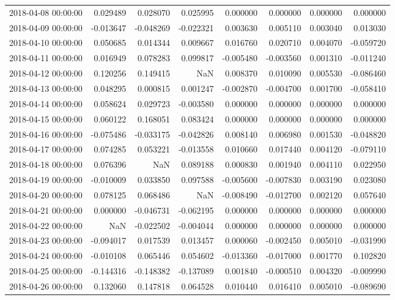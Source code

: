\begin{tabular}{lrrrrrrr}
2018-04-08 00:00:00 & 0.029489 & 0.028070 & 0.025995 & 0.000000 & 0.000000 & 0.000000 & 0.000000 \\
2018-04-09 00:00:00 & -0.013647 & -0.048269 & -0.022321 & 0.003630 & 0.005110 & 0.003040 & 0.013030 \\
2018-04-10 00:00:00 & 0.050685 & 0.014344 & 0.009667 & 0.016760 & 0.020710 & 0.004070 & -0.059720 \\
2018-04-11 00:00:00 & 0.016949 & 0.078283 & 0.099817 & -0.005480 & -0.003560 & 0.001310 & -0.011240 \\
2018-04-12 00:00:00 & 0.120256 & 0.149415 & NaN & 0.008370 & 0.010090 & 0.005530 & -0.086460 \\
2018-04-13 00:00:00 & 0.048295 & 0.000815 & 0.001247 & -0.002870 & -0.004700 & 0.001700 & -0.058410 \\
2018-04-14 00:00:00 & 0.058624 & 0.029723 & -0.003580 & 0.000000 & 0.000000 & 0.000000 & 0.000000 \\
2018-04-15 00:00:00 & 0.060122 & 0.168051 & 0.083424 & 0.000000 & 0.000000 & 0.000000 & 0.000000 \\
2018-04-16 00:00:00 & -0.075486 & -0.033175 & -0.042826 & 0.008140 & 0.006980 & 0.001530 & -0.048820 \\
2018-04-17 00:00:00 & 0.074285 & 0.053221 & -0.013558 & 0.010660 & 0.017440 & 0.004120 & -0.079110 \\
2018-04-18 00:00:00 & 0.076396 & NaN & 0.089188 & 0.000830 & 0.001940 & 0.004110 & 0.022950 \\
2018-04-19 00:00:00 & -0.010009 & 0.033850 & 0.097588 & -0.005600 & -0.007830 & 0.003190 & 0.023080 \\
2018-04-20 00:00:00 & 0.078125 & 0.068486 & NaN & -0.008490 & -0.012700 & 0.002120 & 0.057640 \\
2018-04-21 00:00:00 & 0.000000 & -0.046731 & -0.062195 & 0.000000 & 0.000000 & 0.000000 & 0.000000 \\
2018-04-22 00:00:00 & NaN & -0.022502 & -0.004044 & 0.000000 & 0.000000 & 0.000000 & 0.000000 \\
2018-04-23 00:00:00 & -0.094017 & 0.017539 & 0.013457 & 0.000060 & -0.002450 & 0.005010 & -0.031990 \\
2018-04-24 00:00:00 & -0.010108 & 0.065446 & 0.054602 & -0.013360 & -0.017000 & 0.001770 & 0.102820 \\
2018-04-25 00:00:00 & -0.144316 & -0.148382 & -0.137089 & 0.001840 & -0.000510 & 0.004320 & -0.009990 \\
2018-04-26 00:00:00 & 0.132060 & 0.147818 & 0.064528 & 0.010440 & 0.016410 & 0.005010 & -0.089690 \\

\end{tabular}
